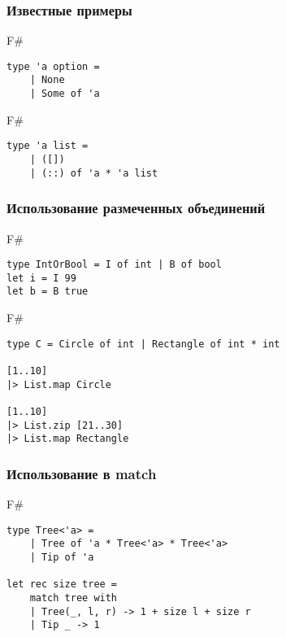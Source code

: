 \documentclass[xetex,mathserif,serif]{beamer}
\begin{document}
	\begin{frame}[fragile]
		\frametitle{Известные примеры}
		\begin{exampleblock}{F\#}
			\begin{lstlisting}
type 'a option =
    | None
    | Some of 'a
\end{lstlisting}
\end{exampleblock}

		\begin{exampleblock}{F\#}
			\begin{lstlisting}
type 'a list =
    | ([])
    | (::) of 'a * 'a list
\end{lstlisting}
\end{exampleblock}
		
\end{frame}

	\begin{frame}[fragile]
		\frametitle{Использование размеченных объединений}
		\begin{exampleblock}{F\#}
			\begin{lstlisting}
type IntOrBool = I of int | B of bool
let i = I 99
let b = B true
\end{lstlisting}
\end{exampleblock}
		
		\begin{exampleblock}{F\#}
			\begin{lstlisting}
type C = Circle of int | Rectangle of int * int

[1..10]
|> List.map Circle

[1..10]
|> List.zip [21..30]
|> List.map Rectangle
\end{lstlisting}
\end{exampleblock}
		
\end{frame}

	\begin{frame}[fragile]
		\frametitle{Использование в match}
		\begin{exampleblock}{F\#}
			\begin{lstlisting}
type Tree<'a> =
    | Tree of 'a * Tree<'a> * Tree<'a>
    | Tip of 'a

let rec size tree =
    match tree with
    | Tree(_, l, r) -> 1 + size l + size r
    | Tip _ -> 1
\end{lstlisting}
\end{exampleblock}
		
\end{frame}
\end{document}
